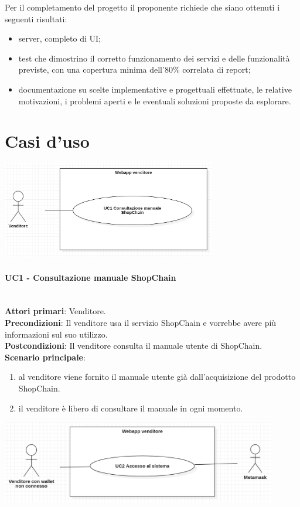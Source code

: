 \documentclass[a4paper, 12pt]{article}
\begin{document}
Per il completamento del progetto il proponente richiede che siano ottenuti i seguenti risultati:
\begin{itemize}
\item server, completo di UI;
\item test che dimostrino il corretto funzionamento dei servizi e delle funzionalità previste, con una copertura minima dell'80\% correlata di report;
\item documentazione su scelte implementative e progettuali effettuate, le relative motivazioni, i problemi aperti e le eventuali soluzioni proposte da esplorare.
\end{itemize}

\section{Casi d'uso}

\includegraphics[width=0.7\textwidth]{UC_WAV1}

\paragraph{UC1 - Consultazione manuale ShopChain}\\
\textbf{Attori primari}: Venditore.\\
\textbf{Precondizioni}: Il venditore usa il servizio ShopChain e vorrebbe avere più informazioni sul suo utilizzo.\\
\textbf{Postcondizioni}: Il venditore consulta il manuale utente di ShopChain.\\
\textbf{Scenario principale}:\\
\begin{enumerate}
\item al venditore viene fornito il manuale utente già dall'acquisizione del prodotto ShopChain.
\item il venditore è libero di consultare il manuale in ogni momento.
\end{enumerate}

\includegraphics[width=0.9\textwidth]{UC_WAV2}
\end{document}
